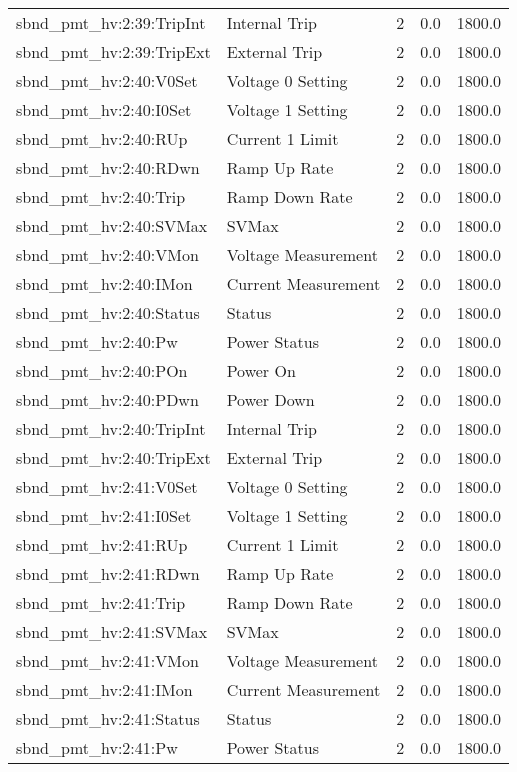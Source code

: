 \begin{center}
\begin{longtable}{l | l l l l }
sbnd\_pmt\_hv:2:39:TripInt & Internal Trip & 2 & 0.0 & 1800.0\\ 
sbnd\_pmt\_hv:2:39:TripExt & External Trip & 2 & 0.0 & 1800.0\\ 
sbnd\_pmt\_hv:2:40:V0Set & Voltage 0 Setting & 2 & 0.0 & 1800.0\\ 
sbnd\_pmt\_hv:2:40:I0Set & Voltage 1 Setting & 2 & 0.0 & 1800.0\\ 
sbnd\_pmt\_hv:2:40:RUp & Current 1 Limit & 2 & 0.0 & 1800.0\\ 
sbnd\_pmt\_hv:2:40:RDwn & Ramp Up Rate & 2 & 0.0 & 1800.0\\ 
sbnd\_pmt\_hv:2:40:Trip & Ramp Down Rate & 2 & 0.0 & 1800.0\\ 
sbnd\_pmt\_hv:2:40:SVMax & SVMax & 2 & 0.0 & 1800.0\\ 
sbnd\_pmt\_hv:2:40:VMon & Voltage Measurement & 2 & 0.0 & 1800.0\\ 
sbnd\_pmt\_hv:2:40:IMon & Current Measurement & 2 & 0.0 & 1800.0\\ 
sbnd\_pmt\_hv:2:40:Status & Status & 2 & 0.0 & 1800.0\\ 
sbnd\_pmt\_hv:2:40:Pw & Power Status & 2 & 0.0 & 1800.0\\ 
sbnd\_pmt\_hv:2:40:POn & Power On & 2 & 0.0 & 1800.0\\ 
sbnd\_pmt\_hv:2:40:PDwn & Power Down & 2 & 0.0 & 1800.0\\ 
sbnd\_pmt\_hv:2:40:TripInt & Internal Trip & 2 & 0.0 & 1800.0\\ 
sbnd\_pmt\_hv:2:40:TripExt & External Trip & 2 & 0.0 & 1800.0\\ 
sbnd\_pmt\_hv:2:41:V0Set & Voltage 0 Setting & 2 & 0.0 & 1800.0\\ 
sbnd\_pmt\_hv:2:41:I0Set & Voltage 1 Setting & 2 & 0.0 & 1800.0\\ 
sbnd\_pmt\_hv:2:41:RUp & Current 1 Limit & 2 & 0.0 & 1800.0\\ 
sbnd\_pmt\_hv:2:41:RDwn & Ramp Up Rate & 2 & 0.0 & 1800.0\\ 
sbnd\_pmt\_hv:2:41:Trip & Ramp Down Rate & 2 & 0.0 & 1800.0\\ 
sbnd\_pmt\_hv:2:41:SVMax & SVMax & 2 & 0.0 & 1800.0\\ 
sbnd\_pmt\_hv:2:41:VMon & Voltage Measurement & 2 & 0.0 & 1800.0\\ 
sbnd\_pmt\_hv:2:41:IMon & Current Measurement & 2 & 0.0 & 1800.0\\ 
sbnd\_pmt\_hv:2:41:Status & Status & 2 & 0.0 & 1800.0\\ 
sbnd\_pmt\_hv:2:41:Pw & Power Status & 2 & 0.0 & 1800.0\\ 

\end{longtable}
\end{center}
